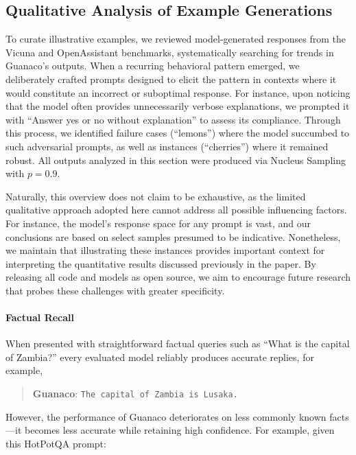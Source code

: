 \subsection{Qualitative Analysis of Example Generations}
\label{ssec:examples}

To curate illustrative examples, we reviewed model-generated responses from the Vicuna and OpenAssistant benchmarks, systematically searching for trends in {Guanaco}'s outputs. When a recurring behavioral pattern emerged, we deliberately crafted prompts designed to elicit the pattern in contexts where it would constitute an incorrect or suboptimal response. For instance, upon noticing that the model often provides unnecessarily verbose explanations, we prompted it with “Answer yes or no without explanation” to assess its compliance. Through this process, we identified failure cases (“lemons”) where the model succumbed to such adversarial prompts, as well as instances (“cherries”) where it remained robust. All outputs analyzed in this section were produced via Nucleus Sampling \cite{holtzmancurious} with $p=0.9$.

Naturally, this overview does not claim to be exhaustive, as the limited qualitative approach adopted here cannot address all possible influencing factors. For instance, the model's response space for any prompt is vast, and our conclusions are based on select samples presumed to be indicative. Nonetheless, we maintain that illustrating these instances provides important context for interpreting the quantitative results discussed previously in the paper. By releasing all code and models as open source, we aim to encourage future research that probes these challenges with greater specificity.

\paragraph{Factual Recall} When presented with straightforward factual queries such as ``What is the capital of Zambia?'' every evaluated model reliably produces accurate replies, for example,

\begin{quote} 
    \textbf{Guanaco}:
    \texttt{The capital of Zambia is Lusaka.}
\end{quote}

However, the performance of {Guanaco} deteriorates on less commonly known facts—it becomes less accurate while retaining high confidence. For example, given this HotPotQA \citep{yang2018hotpotqa} prompt:

